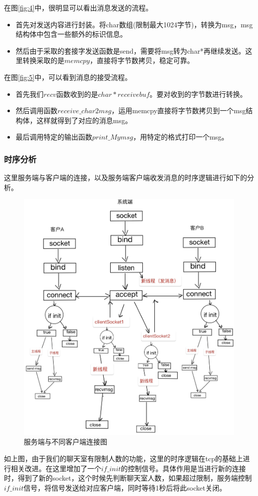 \documentclass[12pt]{article}
\begin{document}
在图\ref{fig:4}中，很明显可以看出消息发送的流程。

\begin{itemize}
    \item 首先对发送内容进行封装。将char数组(限制最大1024字节)，转换为msg，msg结构体中包含一些额外的标识信息。
    \item 然后由于采取的套接字发送函数是send，需要将msg转为char*再继续发送。这里转换采取的是$memcpy$，直接将字节数拷贝，稳定可靠。
\end{itemize}

在图\ref{fig:5}中，可以看到消息的接受流程。

\begin{itemize}
    \item 首先我们$recv$函数收到的是$char* receivebuf$。要对收到的字节数进行转换。
    \item 然后调用函数$receive\_char2msg$，运用memcpy直接将字节数拷贝到一个msg结构体，这样就得到了对应的消息msg。
    \item 最后调用特定的输出函数$print\_Mymsg$，用特定的格式打印一个msg。
\end{itemize}
\subsubsection{时序分析}
这里服务端与客户端的连接，以及服务端客户端收发消息的时序逻辑进行如下的分析。
\begin{figure}[H]
        \centering
        \includegraphics[scale=0.25]{fig/4.png}
        \caption{服务端与不同客户端连接图}
       \label{fig:6}
\end{figure}
如上图，由于我们的聊天室有限制人数的功能，这里的时序逻辑在tcp的基础上进行相关改进。在这里增加了一个$if\_init$的控制信号。具体作用是当进行新的连接时，得到了新的socket，这个时候先判断聊天室人数，如果超过限制，服务端控制$if \_init$信号，将信号发送给对应客户端，同时等待1秒后将此socket关闭。
\end{document}
